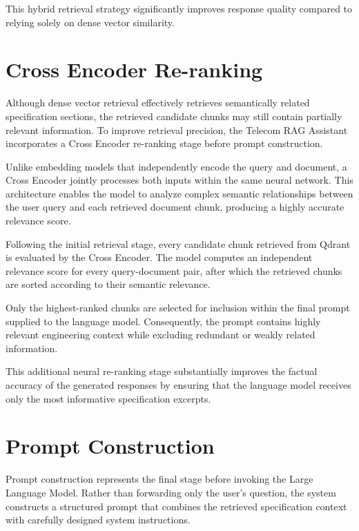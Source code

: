This hybrid retrieval strategy significantly improves response quality compared to relying solely on dense vector similarity.

\section{Cross Encoder Re-ranking}

Although dense vector retrieval effectively retrieves semantically related specification sections, the retrieved candidate chunks may still contain partially relevant information. To improve retrieval precision, the Telecom RAG Assistant incorporates a Cross Encoder re-ranking stage before prompt construction.

Unlike embedding models that independently encode the query and document, a Cross Encoder jointly processes both inputs within the same neural network. This architecture enables the model to analyze complex semantic relationships between the user query and each retrieved document chunk, producing a highly accurate relevance score.

Following the initial retrieval stage, every candidate chunk retrieved from Qdrant is evaluated by the Cross Encoder. The model computes an independent relevance score for every query-document pair, after which the retrieved chunks are sorted according to their semantic relevance.

Only the highest-ranked chunks are selected for inclusion within the final prompt supplied to the language model. Consequently, the prompt contains highly relevant engineering context while excluding redundant or weakly related information.

This additional neural re-ranking stage substantially improves the factual accuracy of the generated responses by ensuring that the language model receives only the most informative specification excerpts.

\section{Prompt Construction}

Prompt construction represents the final stage before invoking the Large Language Model. Rather than forwarding only the user's question, the system constructs a structured prompt that combines the retrieved specification context with carefully designed system instructions.

